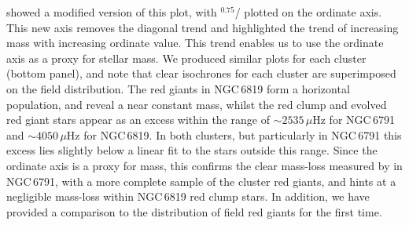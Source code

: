 \cite{yu_asteroseismology_2018-1} showed a modified version of this plot, with \numax{}$^{0.75}$/\dnu{} plotted on the ordinate axis. This new axis removes the diagonal trend and highlighted the trend of increasing mass with increasing ordinate value. This trend enables us to use the ordinate axis as a proxy for stellar mass. We produced similar plots for each cluster (bottom panel), and note that clear isochrones for each cluster are superimposed on the field distribution. The red giants in NGC\,6819 form a horizontal population, and reveal a near constant mass, whilst the red clump and evolved red giant stars appear as an excess within the \numax{} range of $\sim25$\textendash{}$35\,\mu$Hz for NGC\,6791 and $\sim40$\textendash{}$50\,\mu$Hz for NGC\,6819. In both clusters, but particularly in NGC\,6791 this excess lies slightly below a linear fit to the stars outside this \numax{} range. Since the ordinate axis is a proxy for mass, this confirms the clear mass-loss measured by \cite{miglio_asteroseismology_2012} in NGC\,6791, with a more complete sample of the cluster red giants, and hints at a negligible mass-loss within NGC\,6819 red clump stars. In addition, we have provided a comparison to the distribution of field red giants for the first time.

